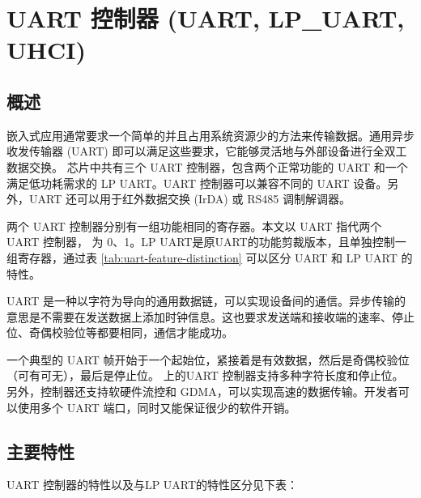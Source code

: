 \documentclass[main\_\_CN.tex]{subfiles}
\begin{document}

\ifglobal
\else
    {\let\clearpage\relax \listoftodos}
    {\let\clearpage\relax \listofdonetodos}
    \tableofcontents
\fi



\hypertarget{uart}{}
\chapter{UART 控制器 (UART, LP\_UART, UHCI)}
\label{mod:uart}


\section{概述}

嵌入式应用通常要求一个简单的并且占用系统资源少的方法来传输数据。通用异步收发传输器 (UART) 即可以满足这些要求，它能够灵活地与外部设备进行全双工数据交换。\chipname{} 芯片中共有三个 UART 控制器，包含两个正常功能的 UART 和一个满足低功耗需求的 LP UART。UART 控制器可以兼容不同的 UART 设备。另外，UART 还可以用于红外数据交换 (IrDA) 或 RS485 调制解调器。

两个 UART 控制器分别有一组功能相同的寄存器。本文以 UART 指代两个 UART 控制器， 为 0、1。LP UART是原UART的功能剪裁版本，且单独控制一组寄存器，通过表 \ref{tab:uart-feature-distinction} 可以区分 UART 和 LP UART 的特性。

UART 是一种以字符为导向的通用数据链，可以实现设备间的通信。异步传输的意思是不需要在发送数据上添加时钟信息。这也要求发送端和接收端的速率、停止位、奇偶校验位等都要相同，通信才能成功。

一个典型的 UART 帧开始于一个起始位，紧接着是有效数据，然后是奇偶校验位（可有可无），最后是停止位。\chipname{} 上的UART 控制器支持多种字符长度和停止位。另外，控制器还支持软硬件流控和 GDMA，可以实现高速的数据传输。开发者可以使用多个 UART 端口，同时又能保证很少的软件开销。

\section{主要特性}

UART 控制器的特性以及与LP UART的特性区分见下表：
\end{document}
